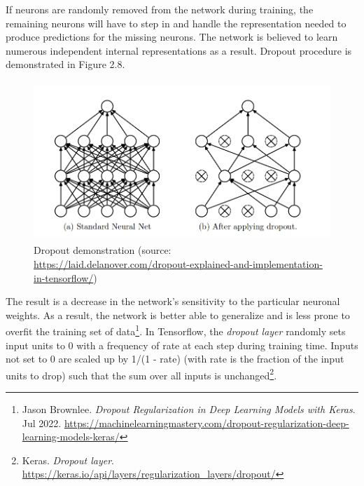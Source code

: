 If neurons are randomly removed from the network during training, the remaining neurons will have to step in and handle the representation needed to produce predictions for the missing neurons. The network is believed to learn numerous independent internal representations as a result. Dropout procedure is demonstrated in Figure 2.8.
\begin{figure}[!h]
	\centering
	\includegraphics[width=\linewidth, height=6cm,keepaspectratio]{figures/dropout.png}
   \caption{Dropout demonstration (source: \url{https://laid.delanover.com/dropout-explained-and-implementation-in-tensorflow/})}
\end{figure}

\newpage
The result is a decrease in the network's sensitivity to the particular neuronal weights. As a result, the network is better able to generalize and is less prone to overfit the training set of data\footnote{
	Jason Brownlee. \textit{Dropout Regularization in Deep Learning Models with Keras}. Jul 2022. \url{https://machinelearningmastery.com/dropout-regularization-deep-learning-models-keras/}
}.
In Tensorflow, the \emph{dropout layer} randomly sets input units to 0 with a frequency of rate
at each step during training time. Inputs not set to 0 are scaled up by 1/(1 - rate)  (with rate is the fraction of the input units to drop) such that the sum over all inputs is unchanged\footnote{Keras. \textit{Dropout layer}. \url{https://keras.io/api/layers/regularization_layers/dropout/}}.
